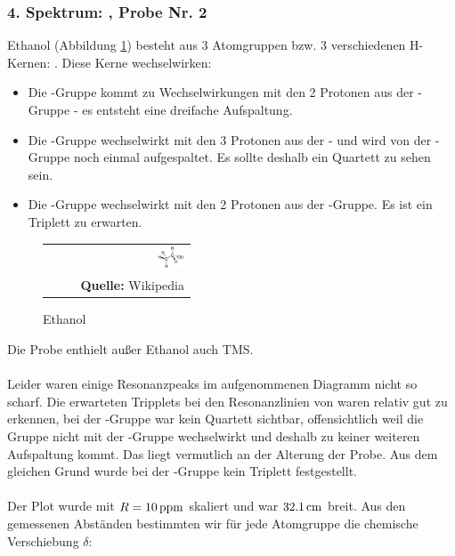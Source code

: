 \documentclass[a4paper,titlepage]{scrartcl}
\numberwithin{equation}{section}
\begin{document}
\subsubsection{4. Spektrum: , Probe Nr. 2}
Ethanol (Abbildung \ref{fig:ethanol}) besteht aus 3 Atomgruppen bzw. 3 verschiedenen H-Kernen: . Diese Kerne wechselwirken:
\begin{itemize}
\item Die -Gruppe kommt zu Wechselwirkungen mit den 2 Protonen aus der -Gruppe - es entsteht eine dreifache Aufspaltung.
\item Die -Gruppe wechselwirkt mit den 3 Protonen aus der - und wird von der -Gruppe noch einmal aufgespaltet. Es sollte deshalb ein Quartett zu sehen sein.
\item Die -Gruppe wechselwirkt mit den 2 Protonen aus der -Gruppe. Es ist ein Triplett zu erwarten.
\end{itemize}
\begin{figure}[H]
	\centering
	\begin{tabular}{@{}r@{}}
		\includegraphics[width=0.2\textwidth]{images/ethanol.png}\\
	\footnotesize\sffamily\textbf{Quelle:} Wikipedia \cite{wiki:ethanol}
	\end{tabular}
	\caption{Ethanol }
    \label{fig:ethanol}
\end{figure}
Die Probe enthielt außer Ethanol auch TMS. \\ \\
Leider waren einige Resonanzpeaks im aufgenommenen Diagramm nicht so scharf. Die erwarteten Tripplets bei den Resonanzlinien von  waren relativ gut zu erkennen, bei der -Gruppe war kein Quartett sichtbar, offensichtlich weil die Gruppe nicht mit der -Gruppe wechselwirkt und deshalb zu keiner weiteren Aufspaltung kommt. Das liegt vermutlich an der Alterung der Probe. Aus dem gleichen Grund wurde bei der -Gruppe kein Triplett festgestellt.\\ \\
Der Plot wurde mit $R=\unit[10]{ppm}$ skaliert und war $\unit[32.1]{cm}$ breit. Aus den gemessenen Abständen bestimmten wir für jede Atomgruppe die chemische Verschiebung $\delta$:
\end{document}
